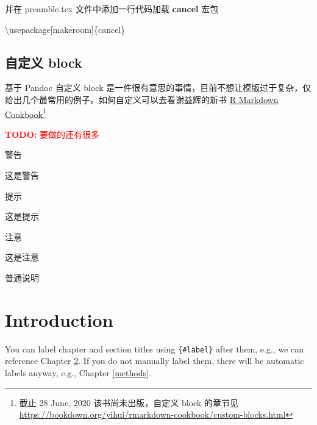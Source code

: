 \documentclass[
  lang=cn,
  11pt,
  scheme=chinese,
  chinesefont=nofont,
  bibstyle=apalike]{elegantbook}
\newenvironment{Shaded}{\begin{snugshade}}{\end{snugshade}}
\newcommand{\BuiltInTok}[1]{#1}
\newcommand{\ExtensionTok}[1]{#1}
\newcommand{\NormalTok}[1]{#1}
\begin{document}
并在 preamble.tex 文件中添加一行代码加载 \textbf{cancel} 宏包

\begin{Shaded}
\begin{Highlighting}[]
\BuiltInTok{\textbackslash{}usepackage}\NormalTok{[makeroom]\{}\ExtensionTok{cancel}\NormalTok{\}}
\end{Highlighting}
\end{Shaded}

\hypertarget{custom-block}{%
\section{自定义 block}\label{custom-block}}

基于 Pandoc 自定义 block 是一件很有意思的事情，目前不想让模版过于复杂，仅给出几个最常用的例子。如何自定义可以去看谢益辉的新书 \href{https://bookdown.org/yihui/rmarkdown-cookbook/}{R Markdown Cookbook}\footnote{截止 28 June, 2020 该书尚未出版，自定义 block 的章节见 \url{https://bookdown.org/yihui/rmarkdown-cookbook/custom-blocks.html}}

\textcolor{red}{\textbf{TODO: }{要做的还有很多}}

\begin{rmdwarn}{警告}

这是警告

\end{rmdwarn}

\begin{rmdtip}{提示}

这是提示

\end{rmdtip}

\begin{rmdnote}{注意}

这是注意

\end{rmdnote}

\begin{rmdinfo}

普通说明

\end{rmdinfo}

\hypertarget{intro}{%
\chapter{Introduction}\label{intro}}

You can label chapter and section titles using \texttt{\{\#label\}} after them, e.g., we can reference Chapter \ref{intro}. If you do not manually label them, there will be automatic labels anyway, e.g., Chapter \ref{methods}.
\end{document}
